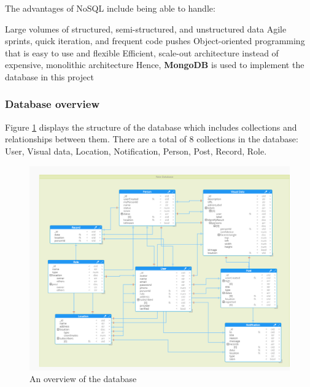 The advantages of NoSQL include being able to handle:

Large volumes of structured, semi-structured, and unstructured data
Agile sprints, quick iteration, and frequent code pushes
Object-oriented programming that is easy to use and flexible
Efficient, scale-out architecture instead of expensive, monolithic architecture
Hence, \textbf{MongoDB} is used to implement the database in this project
\subsubsection{Database overview}
Figure \ref{chap4:database_overview} displays the structure of the database which includes collections and relationships between them.
There are a total of 8 collections in the database: User, Visual data, Location, Notification, Person, Post, Record, Role. 
\begin{center}
    \begin{figure}[H]
    \centering
    \includegraphics[width=1\columnwidth]{images/chap4/Model.png}
    \caption{An overview of the database}
    \label{chap4:database_overview}
    \end{figure}
\end{center}
\cleardoublepage
